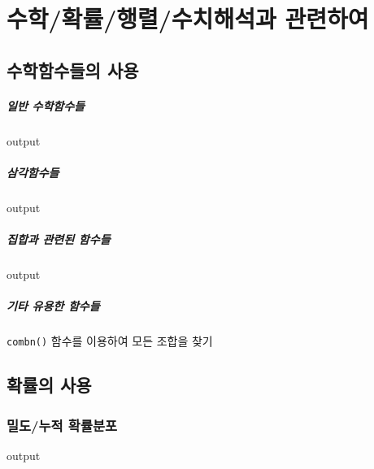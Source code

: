 \documentclass{report}
\begin{document}
%
%
%

\chapter{수학/확률/행렬/수치해석과 관련하여}

\section{수학함수들의 사용}
\paragraph{일반 수학함수들}
\begin{Schunk}
\begin{Soutput}
output
\end{Soutput}
\end{Schunk}
\paragraph{삼각함수들}
\begin{Schunk}
\begin{Soutput}
output
\end{Soutput}
\end{Schunk}
\paragraph{집합과 관련된 함수들}
\begin{Schunk}
\begin{Soutput}
output
\end{Soutput}
\end{Schunk}
\paragraph{기타 유용한 함수들}
\texttt{combn()} 함수를 이용하여 모든 조합을 찾기

\section{확률의 사용}

\subsection{밀도/누적 확률분포}
\begin{Schunk}
\begin{Soutput}
output
\end{Soutput}
\end{Schunk}
\end{document}
